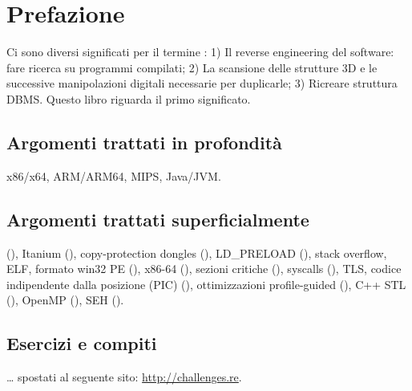 \section*{Prefazione}

Ci sono diversi significati per il termine :
1) Il reverse engineering del software: fare ricerca su programmi compilati;
2) La scansione delle strutture 3D e le successive manipolazioni digitali necessarie per duplicarle;
3) Ricreare struttura \ac{DBMS}.
Questo libro riguarda il primo significato.

\subsection*{Argomenti trattati in profondità}

x86/x64, ARM/ARM64, MIPS, Java/JVM.

\subsection*{Argomenti trattati superficialmente}

\oracle (),
Itanium (),
copy-protection dongles (), 
LD\_PRELOAD (),
stack overflow,
\ac{ELF},
formato win32 PE (),
x86-64 (),
sezioni critiche (),
syscalls (), 
\ac{TLS},
codice indipendente dalla posizione (\ac{PIC}) (), 
ottimizzazioni profile-guided (),
C++ STL (),
OpenMP (),
SEH ().

\subsection*{Esercizi e compiti}

\dots 
spostati al seguente sito: \url{http://challenges.re}.


